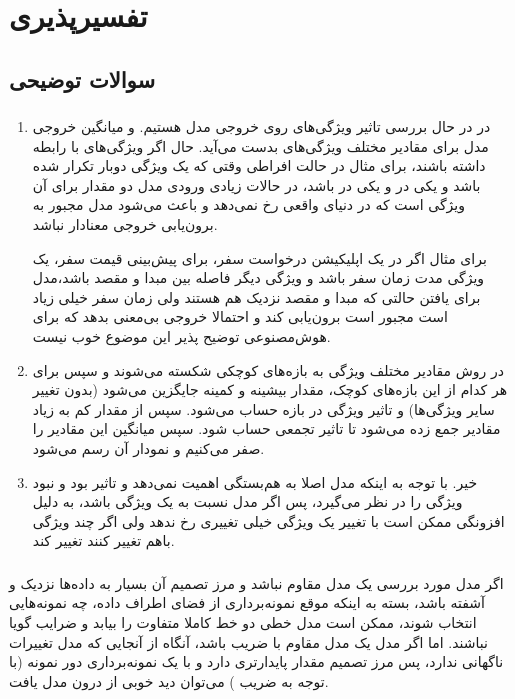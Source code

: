 
\def \Subject {تفسیرپذیری}
\def \Session { یک}
\renewcommand{\chaptername}{سوال}
\chapter{\Subject}
\section{سوالات توضیحی}
\subsection{ }

\begin{enumerate}
\item 
در 
در حال بررسی تاثیر ویژگی‌های 
روی خروجی مدل هستیم. و میانگین خروجی مدل برای مقادیر مختلف ویژگی‌های 
بدست می‌آید. حال اگر ویژگی‌های 
با 
رابطه داشته باشند، برای مثال در حالت افراطی وقتی که یک ویژگی دوبار تکرار شده باشد و یکی در 
و یکی در
باشد،  در حالات زیادی ورودی مدل دو مقدار برای آن ویژگی است که در دنیای واقعی رخ نمی‌دهد و باعث می‌شود مدل مجبور به برون‌یابی
 خروجی معنادار نباشد. 
 
 برای مثال اگر در یک اپلیکیشن درخواست سفر، برای پیش‌بینی قیمت سفر، یک ویژگی مدت زمان سفر باشد و ویژگی دیگر فاصله بین مبدا و مقصد باشد،‌مدل برای  یافتن حالتی که مبدا و مقصد نزدیک هم هستند ولی زمان سفر خیلی زیاد است مجبور است برون‌یابی کند و احتمالا خروجی بی‌معنی بدهد که برای هوش‌مصنوعی توضیح پذیر این موضوع خوب نیست.
 

\item 
در روش 
مقادیر مختلف ویژگی به بازه‌های کوچکی شکسته می‌شوند و سپس برای هر کدام از این بازه‌های کوچک، مقدار بیشینه و کمینه جایگزین می‌شود (بدون تغییر سایر ویژگی‌ها) و تاثیر ویژگی در بازه حساب می‌شود. سپس از مقدار کم به زیاد مقادیر جمع زده می‌شود تا تاثیر تجمعی حساب شود. سپس میانگین این مقادیر را صفر می‌کنیم و نمودار آن رسم می‌شود.

\item 
خیر. با توجه به اینکه مدل 
اصلا به 
هم‌بستگی 
اهمیت نمی‌دهد و تاثیر بود و نبود ویژگی را در نظر می‌گیرد، پس اگر مدل نسبت به یک ویژگی 
باشد، به دلیل افزونگی 
ممکن است با تغییر یک ویژگی خیلی تغییری رخ ندهد ولی اگر چند ویژگی باهم تغییر کنند تغییر کند.
\end{enumerate}

\subsection{ }
اگر مدل مورد بررسی یک مدل مقاوم
نباشد و مرز تصمیم آن بسیار به داده‌ها نزدیک و آشفته باشد، بسته به اینکه موقع نمونه‌برداری از فضای اطراف داده، چه نمونه‌هایی انتخاب شوند، ممکن است مدل خطی دو خط کاملا متفاوت را بیابد و ضرایب گویا نباشند. اما اگر مدل یک مدل مقاوم 
با ضریب 
باشد، آنگاه از آنجایی که مدل تغییرات ناگهانی ندارد، پس مرز تصمیم مقدار پایدارتری دارد و با یک نمونه‌برداری دور نمونه (با توجه به ضریب 
)
می‌توان دید خوبی از درون مدل یافت.

